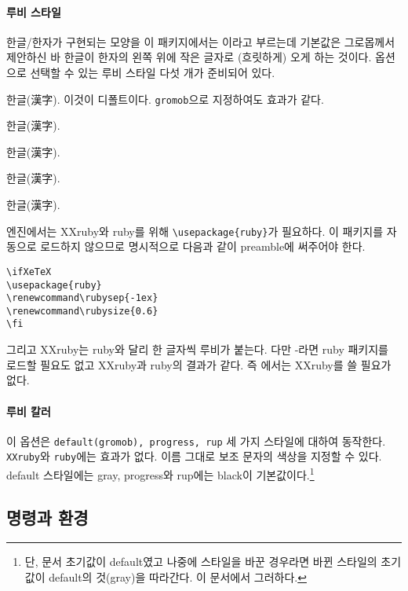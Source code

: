 \documentclass[a4paper,12pt,itemph,footnote]{oblivoir}
\renewcommand\rubysep{-1ex}
\renewcommand\rubysize{0.6}
\begin{document}
\paragraph{루비 스타일}
한글/한자가 구현되는 모양을 이 패키지에서는 이라고 부르는데 기본값은 그로몹께서 제안하신 바 한글이 한자의 왼쪽 위에 작은 글자로 (흐릿하게) 오게 하는 것이다. 옵션으로 선택할 수 있는 루비 스타일 다섯 개가 준비되어 있다. 
\begin{description} \firmlist
\item[\ttfamily default]  \grfoo 한글(漢字). 이것이 디폴트이다. \texttt{gromob}으로 지정하여도 효과가 같다.
\item[\ttfamily XXruby]   \grfoo 한글(漢字).
\item[\ttfamily ruby]  \grfoo 한글(漢字).
\item[\ttfamily progress]   \grfoo 한글(漢字).
\item[\ttfamily rup]  \grfoo 한글(漢字).
\end{description}
 엔진에서는 XXruby와 ruby를 위해 \verb|\usepackage{ruby}|가 필요하다. 이 패키지를 자동으로 로드하지 않으므로 명시적으로 다음과 같이 preamble에 써주어야 한다.
\begin{verbatim}
\ifXeTeX
\usepackage{ruby}
\renewcommand\rubysep{-1ex}
\renewcommand\rubysize{0.6}
\fi
\end{verbatim}
그리고 XXruby는 ruby와 달리 한 글자씩 루비가 붙는다. 다만 -\ko 라면 ruby 패키지를 로드할 필요도 없고 XXruby과 ruby의 결과가 같다. 즉 에서는 XXruby를 쓸 필요가 없다.

\paragraph{루비 칼러}
이 옵션은 \texttt{default(gromob), progress, rup} 세 가지 스타일에 대하여 동작한다. \texttt{XXruby}와 \texttt{ruby}에는 효과가 없다. 이름 그대로 보조 문자의 색상을 지정할 수 있다. default 스타일에는 gray, progress와 rup에는 black이 기본값이다.\footnote{단, 문서 초기값이 default였고 나중에 스타일을 바꾼 경우라면 바뀐 스타일의 초기값이 default의 것(gray)을 따라간다. 이 문서에서 그러하다.}


\subsection{명령과 환경}
\end{document}
